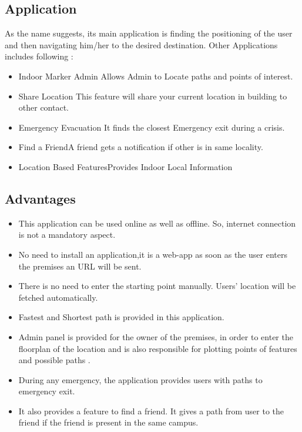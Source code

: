 ﻿\documentclass[a4paper, 12pt]{article}
\begin{document}
\subsection{Application}
As the name suggests, its main application is finding the positioning of the user and then navigating him/her to the desired destination.
\linebreak
Other Applications includes following :
\begin{itemize}
	\item {Indoor Marker Admin} Allows Admin to Locate  paths and points of interest.
	\item {Share Location} This feature will share your current location in building to other contact.
	\item {Emergency Evacuation} 	It finds the closest Emergency exit during a crisis.
	\item {Find a Friend}A friend gets a notification if other is in same locality.
	\item {Location Based Features}Provides Indoor Local Information
\end{itemize}

\subsection{Advantages}
\begin{itemize}
	\item This application can be used online as well as offline. So, internet connection is not a mandatory aspect.
	\item No need to install an application,it is a web-app as soon as the user enters the premises an URL will be sent.
	\item There is no need to enter the starting point manually. Users’ location will be fetched automatically.
	\item Fastest and Shortest path is provided in this application.
	\item Admin panel is provided for the owner of the premises, in order to enter the floorplan of the location and is also responsible for plotting points of features and possible paths .
	\item During any emergency, the application provides users with paths to emergency exit.
	\item It also provides a feature to find a friend. It gives a path from user to the friend if the friend is present in the same campus.
\end{itemize}
\end{document}
